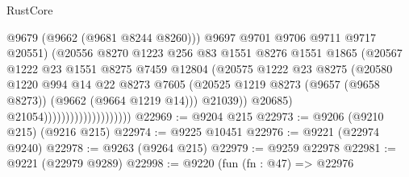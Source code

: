 \begin{lexlean}{RustCore}
\begin{coremodule}
                                              @9679
                                              (@9662 (@9681 @8244 @8260)))
                                            @9697
                                            @9701
                                            @9706
                                            @9711
                                            @9717
                                            @20551)
                                          (@20556
                                            @8270
                                            @1223
                                            @256
                                            @83
                                            @1551
                                            @8276
                                            @1551
                                            @1865
                                            (@20567
                                              @1222
                                              @23
                                              @1551
                                              @8275
                                              @7459
                                              @12804
                                              (@20575
                                                @1222
                                                @23
                                                @8275
                                                (@20580
                                                  @1220
                                                  @994
                                                  @14
                                                  @22
                                                  @8273
                                                  @7605
                                                  (@20525
                                                    @1219
                                                    @8273
                                                    (@9657 (@9658 @8273))
                                                    (@9662 (@9664 @1219 @14)))
                                                  @21039))
                                              @20685)
                                            @21054))))))))))))))))))))
@22969 := @9204 @215
@22973 := @9206 (@9210 @215) (@9216 @215)
@22974 := @9225 @10451
@22976 := @9221 (@22974 @9240)
@22978 := @9263 (@9264 @215)
@22979 := @9259 @22978
@22981 := @9221 (@22979 @9289)
@22998 := @9220
    (fun (fn : @47) =>
    @22976

\end{coremodule}
\end{lexlean}
